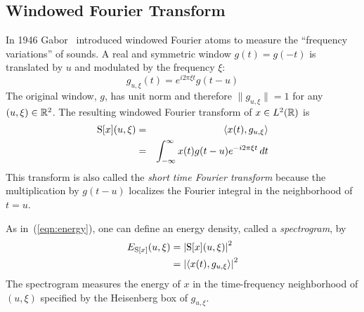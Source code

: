 {\subsection{Windowed Fourier Transform\protect\footnotemark}
}
In 1946 Gabor~\cite{Gabor:1946} introduced windowed Fourier atoms to
measure the ``frequency variations'' of sounds.  A real and symmetric
window $g(t)=g(-t)$ is translated by $u$ and modulated by the
frequency $\xi$:
\[g_{u,\xi}(t) = e^{i2\pi\xi t}g(t-u)\]
The original window, $g$, has unit norm and therefore $\|g_{u,\xi}\|=1$
for any $(u,\xi)\in \R^2$.  The resulting windowed Fourier transform
of $x\in \LtwoR$ is 
\begin{eqnarray}\label{eqn:WindowedFT}
  \S[x](u,\xi) 
  &=& \langle x(t),g_{u,\xi} \rangle \nonumber\\
  &=& \integral x(t)g(t-u) e^{-i2\pi \xi t}\,dt
\end{eqnarray}
This transform is also called the \emph{short time Fourier transform}
because the multiplication by $g(t-u)$ localizes the Fourier integral
in the neighborhood of $t=u$.

As in~(\ref{eqn:energy}), one can define an energy density, called a
\emph{spectrogram}, by
\begin{align*}
  E_{\S[x]}(u,\xi)  &= \left|\S[x](u,\xi)\right|^2\\
  &= \left|\langle x(t),g_{u,\xi}\rangle\right|^2 
\end{align*}
The spectrogram measures the energy of $x$ in the time-frequency
neighborhood of $(u,\xi)$ specified by the Heisenberg box of
$g_{u,\xi}$. 

